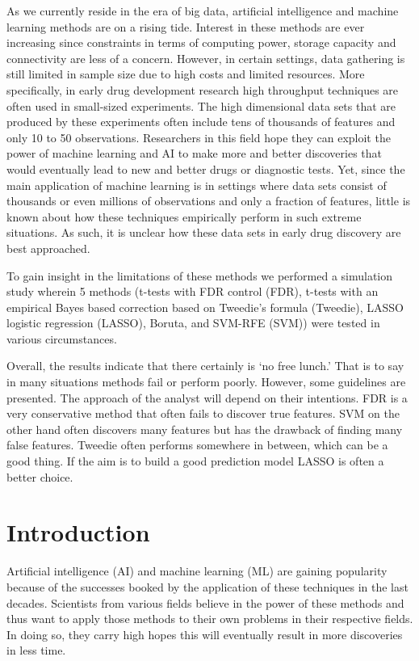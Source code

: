 \documentclass[
]{article}
\begin{document}
As we currently reside in the era of big data, artificial intelligence and machine learning methods are on a rising tide. Interest in these methods are ever increasing since constraints in terms of computing power, storage capacity and connectivity are less of a concern. However, in certain settings, data gathering is still limited in sample size due to high costs and limited resources. More specifically, in early drug development research high throughput techniques are often used in small-sized experiments. The high dimensional data sets that are produced by these experiments often include tens of thousands of features and only 10 to 50 observations. Researchers in this field hope they can exploit the power of machine learning and AI to make more and better discoveries that would eventually lead to new and better drugs or diagnostic tests. Yet, since the main application of machine learning is in settings where data sets consist of thousands or even millions of observations and only a fraction of features, little is known about how these techniques empirically perform in such extreme situations. As such, it is unclear how these data sets in early drug discovery are best approached.

To gain insight in the limitations of these methods we performed a simulation study wherein 5 methods (t-tests with FDR control (FDR), t-tests with an empirical Bayes based correction based on Tweedie's formula (Tweedie), LASSO logistic regression (LASSO), Boruta, and SVM-RFE (SVM)) were tested in various circumstances.

Overall, the results indicate that there certainly is `no free lunch.' That is to say in many situations methods fail or perform poorly. However, some guidelines are presented. The approach of the analyst will depend on their intentions. FDR is a very conservative method that often fails to discover true features. SVM on the other hand often discovers many features but has the drawback of finding many false features. Tweedie often performs somewhere in between, which can be a good thing. If the aim is to build a good prediction model LASSO is often a better choice.

\newpage

\hypertarget{introduction}{%
\section{Introduction}\label{introduction}}

Artificial intelligence (AI) and machine learning (ML) are gaining popularity because of the successes booked by the application of these techniques in the last decades. Scientists from various fields believe in the power of these methods and thus want to apply those methods to their own problems in their respective fields. In doing so, they carry high hopes this will eventually result in more discoveries in less time.
\end{document}
